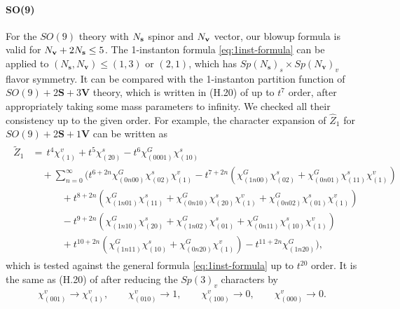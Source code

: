 \documentclass[letterpaper, 11pt]{article}
\begin{document}
{\paragraph{SO(9)}
For the $SO(9)$ theory with $N_{\bf s}$ spinor and $N_{\bf v}$ vector, our blowup formula is valid for $N_{\bf v} + 2 N_{\bf s} \le 5$. 
The 1-instanton formula \eqref{eq:1inst-formula} can be applied to $(N_\mathbf{s}, N_{\mathbf{v}}) \leq (1,3)$ or $(2,1)$, which has $Sp(N_\mathbf{s})_s \times Sp(N_\mathbf{v})_v$ flavor symmetry. It can be compared with the 1-instanton partition function of $SO(9) + 2\mathbf{S} + 3\mathbf{V}$ theory, which is written in (H.20) of \cite{DelZotto:2018tcj} up to $t^7$ order, after appropriately taking some mass parameters to infinity. We checked all their consistency up to the given order. For example, the character expansion of $\hat{Z}_{1}$ for $SO(9) + 2\mathbf{S} + 1\mathbf{V}$  can be written as  
\begin{align}
  \label{eq:SO9-v1s2}
  \begin{split}
  \tilde{Z}_1&=\, t^4\chi^v_{(1)}+t^5\chi^s_{(20)}-t^6\chi_{(0001)}^G\chi^s_{(10)}
   \\&\quad +\sum_{n=0}^{\infty}\Bigg(t^{6+2n}\chi^G_{(0n00)}\chi^s_{(02)}\chi^v_{(1)}
  -t^{7+2n}\left(\chi^G_{(1n00)}\chi^s_{(02)}+\chi^G_{(0n01)}\chi^s_{(11)}\chi^v_{(1)}\right) 
  \\&\qquad \quad+t^{8+2n}\left(\chi^G_{(1n01)}\chi^s_{(11)}+\chi^G_{(0n10)}\chi^s_{(20)}\chi^v_{(1)} 
  +\chi^G_{(0n02)}\chi^s_{(01)}\chi^v_{(1)}\right)
  \\&\qquad \quad-t^{9+2n}\left(\chi^G_{(1n10)}\chi^s_{(20)}+\chi^G_{(1n02)}\chi^s_{(01)}+\chi^G_{(0n11)}\chi^s_{(10)}\chi^v_{(1)}\right)\\
  &\qquad \quad+t^{10+2n}\left(\chi^G_{(1n11)}\chi^s_{(10)}+\chi^G_{(0n20)}\chi^v_{(1)}\right) -t^{11+2n}\chi^G_{(1n20)} \Bigg),
  \end{split}
  \end{align}
which is tested against the general formula \eqref{eq:1inst-formula} up to $t^{20}$ order. It is the same as (H.20) of \cite{DelZotto:2018tcj} after reducing the $Sp(3)_v$ characters by 
\begin{align}
  \chi^{v}_{(001)}\rightarrow \chi^{v}_{(1)},\qquad \chi^{v}_{(010)}\rightarrow 1,\qquad \chi^{v}_{(100)}\rightarrow 0,\qquad\chi^{v}_{(000)}\rightarrow 0.
\end{align}



}
\end{document}
